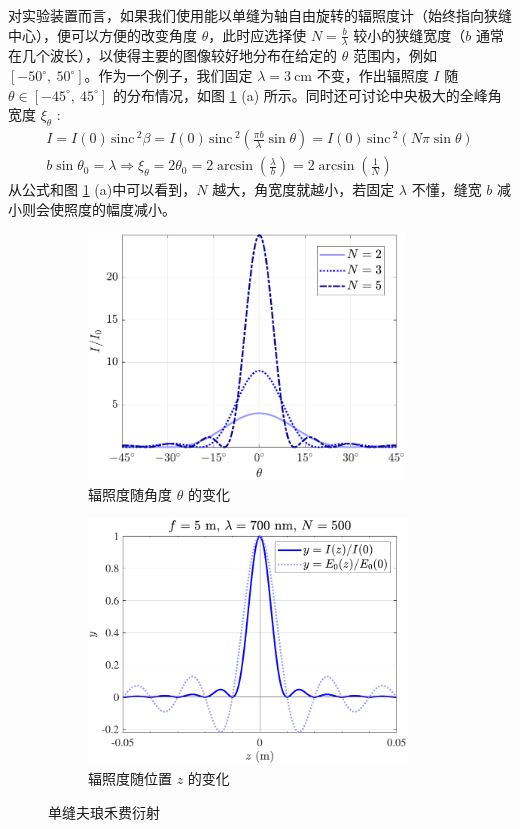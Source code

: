 \documentclass[UTF8]{report}
\def\sinc{\mathrm{\,sinc}\,}
\theoremstyle{MyLineTheoremStyle} %
\theoremstyle{MyBlockTheoremStyle} %
\theoremstyle{MySubsubsectionStyle} %
\begin{document}
对实验装置而言，如果我们使用能以单缝为轴自由旋转的辐照度计（始终指向狭缝中心），便可以方便的改变角度 $\theta$，此时应选择使 $N = \frac{b}{\lambda}$ 较小的狭缝宽度（$b$ 通常在几个波长），以使得主要的图像较好地分布在给定的 $\theta$ 范围内，例如 $[-50^\circ,\ 50^\circ]$。作为一个例子，我们固定 $\lambda = 3 \ \mathrm{cm}$ 不变，作出辐照度 $I$ 随 $\theta \in [-45^\circ,\ 45^\circ]$ 的分布情况，如图 \ref{单缝夫琅禾费衍射} (a) 所示。同时还可讨论中央极大的全峰角宽度 $\xi_{\theta}$ : 
\begin{gather}
I = I(0) \sinc^2 \beta =  I(0) \sinc^2\left( \frac{\pi b}{\lambda} \sin \theta \right) = I(0) \sinc^2\left( N \pi \sin \theta \right) \\ 
b \sin \theta_0 = \lambda \Longrightarrow \xi_{\theta} = 2 \theta_0 = 2 \arcsin \left(\frac{\lambda}{b}\right) = 2 \arcsin \left(\frac{1}{N}\right)
\end{gather}
从公式和图 \ref{单缝夫琅禾费衍射} (a)中可以看到，$N$ 越大，角宽度就越小，若固定 $\lambda$ 不懂，缝宽 $b$ 减小则会使照度的幅度减小。


\begin{figure}[H]\centering
\begin{subfigure}[b]{0.5\columnwidth}\centering
    \includegraphics[height=185pt]{assets/4/4.3 辐照度随角度变化.pdf}
    \caption{辐照度随角度 $\theta$ 的变化}
\end{subfigure}\hfill
\begin{subfigure}[b]{0.5\columnwidth}\centering
    \includegraphics[height=185pt]{assets/4/4.3 辐照度随位置变化.pdf}
    \caption{辐照度随位置 $z$ 的变化}
\end{subfigure}
\caption{单缝夫琅禾费衍射}
\label{单缝夫琅禾费衍射}
\end{figure}
\end{document}
